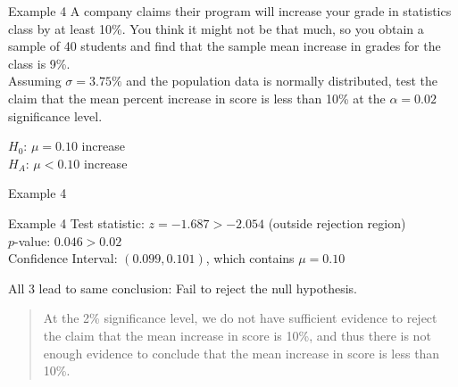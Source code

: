\documentclass[t]{beamer}
\begin{document}
\begin{frame}{Example 4}
A company claims their program will increase your grade in statistics class by at least 10\%. You think it might not be that much, so you obtain a sample of 40 students and find that the sample mean increase in grades for the class is 9\%.	\newline\\

Assuming $\sigma = 3.75\%$ and the population data is normally distributed, test the claim that the mean percent increase in score is less than 10\% at the $\alpha = 0.02$ significance level.		\newline\\	\pause

$H_0: \, \mu = 0.10$ increase \newline\\
$H_A: \, \mu < 0.10$ increase
\end{frame}

\begin{frame}{Example 4}
\begin{center}
\end{center}
\end{frame}

\begin{frame}{Example 4}
Test statistic: $z = -1.687 > -2.054$ (outside rejection region)	\newline\\
$p$-value: $0.046 > 0.02$	\newline\\
Confidence Interval: $(0.099, 0.101)$, which contains $\mu = 0.10$	\newline\\	\pause

All 3 lead to same conclusion: Fail to reject the null hypothesis.	\newline\\	\pause

\begin{quote}
At the 2\% significance level, we do not have sufficient evidence to reject the claim that the mean increase in score is 10\%, and thus there is not enough evidence to conclude that the mean increase in score is less than 10\%.
\end{quote}
\end{frame}
\end{document}
